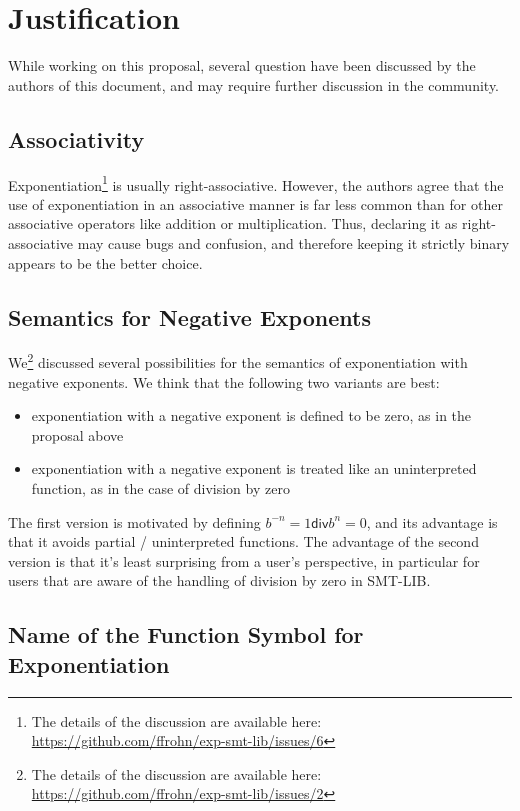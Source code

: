 \documentclass{article}
\begin{document}
\section{Justification}

While working on this proposal, several question have been discussed by the authors of this document, and may require further discussion in the community.

\subsection{Associativity}

Exponentiation\footnote{The details of the discussion are available here: \url{https://github.com/ffrohn/exp-smt-lib/issues/6}} is usually right-associative.
%
However, the authors agree that the use of exponentiation in an associative manner is far less common than for other associative operators like addition or multiplication.
%
Thus, declaring it as right-associative may cause bugs and confusion, and therefore keeping it strictly binary appears to be the better choice.

\subsection{Semantics for Negative Exponents}

We\footnote{The details of the discussion are available here: \url{https://github.com/ffrohn/exp-smt-lib/issues/2}} discussed several possibilities for the semantics of exponentiation with negative exponents.
%
We think that the following two variants are best:
%
\begin{itemize}
\item exponentiation with a negative exponent is defined to be zero, as in the proposal above
\item exponentiation with a negative exponent is treated like an uninterpreted function, as in the case of division by zero
\end{itemize}
%
The first version is motivated by defining $b^{-n} = 1 \mathrel{\mathsf{div}} b^n = 0$, and its advantage is that it avoids partial / uninterpreted functions.
%
The advantage of the second version is that it's least surprising from a user's perspective, in particular for users that are aware of the handling of division by zero in SMT-LIB.

\subsection{Name of the Function Symbol for Exponentiation}
\end{document}
